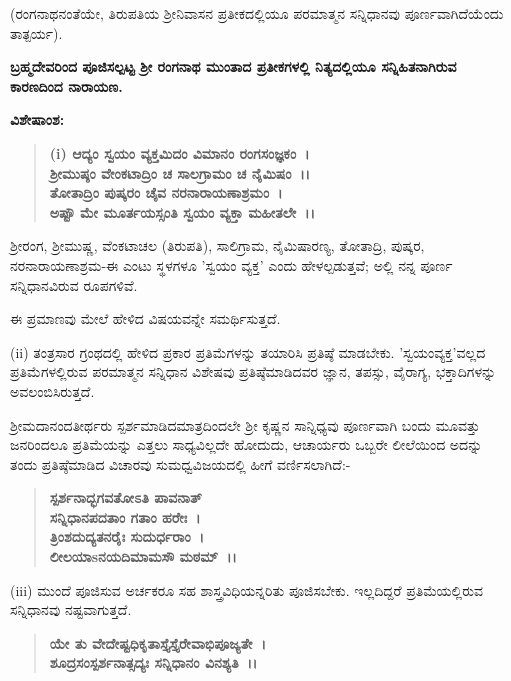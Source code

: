 (ರಂಗನಾಥನಂತೆಯೇ, ತಿರುಪತಿಯ ಶ‍್ರೀನಿವಾಸನ ಪ್ರತೀಕದಲ್ಲಿಯೂ ಪರಮಾತ್ಮನ ಸನ್ನಿಧಾನವು ಪೂರ್ಣವಾಗಿದೆಯೆಂದು ತಾತ್ಪರ್ಯ).

\newpage

\begin{center}
\textbf{ಬ್ರಹ್ಮದೇವರಿಂದ ಪೂಜಿಸಲ್ಪಟ್ಟ ಶ‍್ರೀ ರಂಗನಾಥ ಮುಂತಾದ ಪ್ರತೀಕಗಳಲ್ಲಿ ನಿತ್ಯದಲ್ಲಿಯೂ ಸನ್ನಿಹಿತನಾಗಿರುವ ಕಾರಣದಿಂದ ನಾರಾಯಣ.}
\end{center}

\noindent
\textbf{ವಿಶೇಷಾಂಶ:\enginline{-}}

\begin{verse}
\textbf{(i) ಆದ್ಯಂ ಸ್ವಯಂ ವ್ಯಕ್ತಮಿದಂ ವಿಮಾನಂ ರಂಗಸಂಜ್ಞಕಂ~।}\\\textbf{ಶ‍್ರೀಮುಷ್ಠಂ ವೇಂಕಟಾದ್ರಿಂ ಚ ಸಾಲಗ್ರಾಮಂ ಚ ನೈಮಿಷಂ~।।}\\\textbf{ತೋತಾದ್ರಿಂ ಪುಷ್ಕರಂ ಚೈವ ನರನಾರಾಯಣಾಶ್ರಮಂ~।}\\\textbf{ಅಷ್ಟೌ ಮೇ ಮೂರ್ತಯಸ್ಸಂತಿ ಸ್ವಯಂ ವ್ಯಕ್ತಾ ಮಹೀತಲೇ~।।}
\end{verse}

ಶ‍್ರೀರಂಗ, ಶ‍್ರೀಮುಷ್ಣ, ವೆಂಕಟಾಚಲ (ತಿರುಪತಿ), ಸಾಲಿಗ್ರಾಮ, ನೈಮಿಷಾರಣ್ಯ, ತೋತಾದ್ರಿ, ಪುಷ್ಕರ, ನರನಾರಾಯಣಾಶ್ರಮ-ಈ ಎಂಟು ಸ್ಥಳಗಳೂ 'ಸ್ವಯಂ ವ್ಯಕ್ತ' ಎಂದು ಹೇಳಲ್ಪಡುತ್ತವೆ; ಅಲ್ಲಿ ನನ್ನ ಪೂರ್ಣ ಸನ್ನಿಧಾನವಿರುವ ರೂಪಗಳಿವೆ.

ಈ ಪ್ರಮಾಣವು ಮೇಲೆ ಹೇಳಿದ ವಿಷಯವನ್ನೇ ಸಮರ್ಥಿಸುತ್ತದೆ.

(ii) ತಂತ್ರಸಾರ ಗ್ರಂಥದಲ್ಲಿ ಹೇಳಿದ ಪ್ರಕಾರ ಪ್ರತಿಮೆಗಳನ್ನು ತಯಾರಿಸಿ ಪ್ರತಿಷ್ಠೆ ಮಾಡಬೇಕು. 'ಸ್ವಯಂವ್ಯಕ್ತ'ವಲ್ಲದ ಪ್ರತಿಮೆಗಳಲ್ಲಿರುವ ಪರಮಾತ್ಮನ ಸನ್ನಿಧಾನ ವಿಶೇಷವು ಪ್ರತಿಷ್ಠೆಮಾಡಿದವರ ಜ್ಞಾನ, ತಪಸ್ಸು, ವೈರಾಗ್ಯ, ಭಕ್ತಾದಿಗಳನ್ನು ಅವಲಂಬಿಸಿರುತ್ತದೆ.

ಶ‍್ರೀಮದಾನಂದತೀರ್ಥರು ಸ್ಪರ್ಶಮಾಡಿದಮಾತ್ರದಿಂದಲೇ ಶ‍್ರೀ ಕೃಷ್ಣನ ಸಾನ್ನಿಧ್ಯವು ಪೂರ್ಣವಾಗಿ ಬಂದು ಮೂವತ್ತು ಜನರಿಂದಲೂ ಪ್ರತಿಮೆಯನ್ನು ಎತ್ತಲು ಸಾಧ್ಯವಿಲ್ಲದೇ ಹೋದುದು, ಆಚಾರ್ಯರು ಒಬ್ಬರೇ ಲೀಲೆಯಿಂದ ಅದನ್ನು ತಂದು ಪ್ರತಿಷ್ಠೆಮಾಡಿದ ವಿಚಾರವು ಸುಮಧ್ವವಿಜಯದಲ್ಲಿ ಹೀಗೆ ವರ್ಣಿಸಲಾಗಿದೆ:-

\begin{verse}
\textbf{ಸ್ಪರ್ಶನಾದ್ಭಗವತೋಽತಿ ಪಾವನಾತ್}\\\textbf{ಸನ್ನಿಧಾನಪದತಾಂ ಗತಾಂ ಹರೇಃ~।}\\\textbf{ತ್ರಿಂಶದುದ್ಯತನರೈಃ ಸುದುರ್ಧರಾಂ~।}\\\textbf{ಲೀಲಯಾsನಯದಿಮಾಮಸೌ ಮಠಮ್~।।}
\end{verse}

(iii) ಮುಂದೆ ಪೂಜಿಸುವ ಅರ್ಚಕರೂ ಸಹ ಶಾಸ್ತ್ರವಿಧಿಯನ್ನರಿತು ಪೂಜಿಸಬೇಕು. ಇಲ್ಲದಿದ್ದರೆ ಪ್ರತಿಮೆಯಲ್ಲಿರುವ ಸನ್ನಿಧಾನವು ನಷ್ಟವಾಗುತ್ತದೆ.

\begin{verse}
\textbf{ಯೇ ತು ವೇದೇಷ್ಟಧಿಕೃತಾಸ್ತೈಸ್ತೈರೇವಾಭಿಪೂಜ್ಯತೇ~।}\\\textbf{ಶೂದ್ರಸಂಸ್ಪರ್ಶನಾತ್ಸದ್ಯಃ ಸನ್ನಿಧಾನಂ ವಿನಶ್ಯತಿ~।।}
\end{verse}

